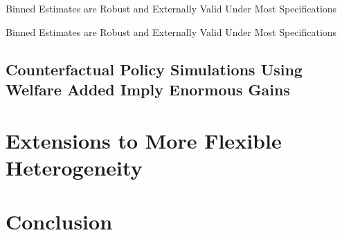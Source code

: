 \documentclass[letterpaper,12pt]{article}
\begin{document}
\begin{table}[]
    \centering
    
    \caption{Binned Estimates are Robust and Externally Valid Under Most Specifications}
    \label{tab:my_label}
\end{table}

\begin{table}[]
    \centering
    
    \caption{Binned Estimates are Robust and Externally Valid Under Most Specifications}
    \label{tab:my_label}
\end{table}

   
   
   



\subsection{Counterfactual Policy Simulations Using Welfare Added Imply Enormous Gains}





\section{Extensions to More Flexible Heterogeneity}





\section{Conclusion}\label{sec: Conclusion}









\appendix
\section{}
\end{document}
